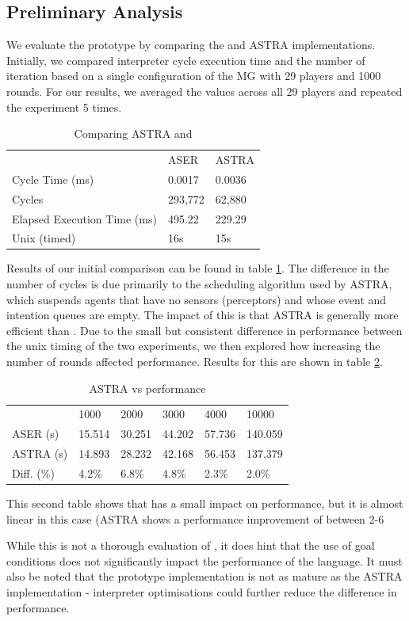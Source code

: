 \subsection{Preliminary Analysis}
\label{performance}

We evaluate the prototype by comparing the {\aser} and ASTRA implementations. Initially,
we compared interpreter cycle execution time and the number of iteration based on a
single configuration of the MG with 29 players and 1000 rounds. For our results, we averaged
the values across all 29 players and repeated the experiment 5 times.

\begin{table}[]
\centering
\caption{Comparing ASTRA and {\aser}}
\label{comparison}
\begin{tabular}{lll}
                      & ASER    & ASTRA  \\
Cycle Time (ms)             & 0.0017  & 0.0036 \\
Cycles                      & 293,772 & 62,880 \\
Elapsed Execution Time (ms) & 495.22  & 229.29 \\
Unix (timed)                & 16s     & 15s   
\end{tabular}
\end{table}

Results of our initial comparison can be found in table \ref{comparison}. The difference
in the number of cycles is due primarily to the scheduling algorithm used by ASTRA, which
suspends agents that have no sensors (perceptors) and whose event and intention queues are empty.
The impact of this is that ASTRA is generally more efficient than {\aser}. Due to the small but 
consistent difference in performance between the unix timing of the two experiments, we then 
explored how increasing the number of rounds affected performance. Results for this are shown 
in table \ref{rounds}.

\begin{table}[]
\centering
\caption{ASTRA vs {\aser} performance}
\label{rounds}
\begin{tabular}{llllll}
           & 1000   & 2000   & 3000   & 4000   & 10000   \\
ASER (s)   & 15.514 & 30.251 & 44.202 & 57.736 & 140.059 \\
ASTRA (s)  & 14.893 & 28.232 & 42.168 & 56.453 & 137.379 \\
Diff. (\%) & 4.2\%  & 6.8\%  & 4.8\%  & 2.3\%  & 2.0\%  
\end{tabular}
\end{table}

This second table shows that {\aser} has a small impact on performance, but it is 
almost linear in this case (ASTRA shows a performance improvement of between 2-6%

While this is not a thorough evaluation of {\aser}, it does hint that the use of
goal conditions does not significantly impact the performance of the language. It 
must also be noted that the prototype implementation is not as mature as the ASTRA
implementation - interpreter optimisations could further reduce the difference 
in performance.

